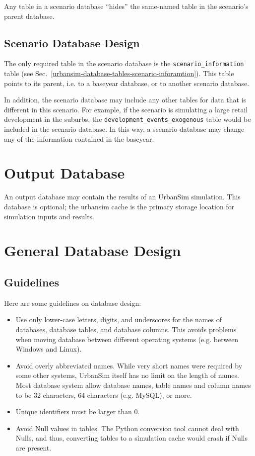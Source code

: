 Any table in a scenario database ``hides'' the same-named table in the
scenario's parent database.

\subsection{Scenario Database Design}

The only required table in the scenario database is the
\verb|scenario_information| table (see Sec.~\ref{urbansim-database-tables-scenario-inforamtion}).
This table points to its parent, i.e. to a baseyear database, or
to another scenario database.

In addition, the scenario database may include any other tables for data that
is different in this scenario. For example, if the scenario is simulating a
large retail development in the suburbs, the \verb|development_events_exogenous| table
would be included in the scenario database.  In this way, a scenario database
may change any of the information contained in the baseyear.

\section{Output Database}

An output database may contain the results of an UrbanSim simulation.  This
database is optional; the urbansim cache is the primary storage location for
simulation inputs and results.

\section{General Database Design}

\subsection{Guidelines}

Here are some guidelines on database design:

\begin{itemize}
\item Use only lower-case letters, digits, and underscores for the names of
databases, database tables, and database columns. This avoids problems when
moving database between different operating systems (e.g. between Windows \windowsindex and
Linux). \linuxindex
\item Avoid overly abbreviated names.  While very short names were required by
some other systems, UrbanSim itself has no limit on the length of names. Most
database system allow database names, table names and column names to be 32
characters, 64 characters (e.g. MySQL), \mysqlindex or more.
\item Unique identifiers must be larger than 0. 
\item Avoid Null values in tables. The Python conversion tool cannot deal with 
Nulls, and thus, converting tables to a simulation cache would crash if Nulls are present.  
\end{itemize}

